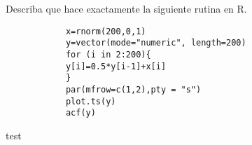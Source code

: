 \documentclass[../main.tex]{subfiles}
\begin{document}
    \begin{enunciado}
        Describa que hace exactamente la siguiente rutina en R.
        \begin{verbatim}
            x=rnorm(200,0,1)
            y=vector(mode="numeric", length=200)
            for (i in 2:200){
            y[i]=0.5*y[i-1]+x[i]
            }
            par(mfrow=c(1,2),pty = "s")
            plot.ts(y)
            acf(y)
        \end{verbatim}
    \end{enunciado}
    
    \begin{demostracion}
        test
    \end{demostracion}
\end{document}
